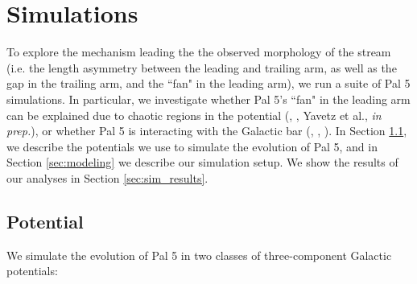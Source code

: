 \documentclass[modern]{aastex62}
\begin{document}
\section{Simulations}
\label{sec:sim}
To explore the mechanism leading the the observed morphology of the stream (i.e. the length asymmetry between the leading and trailing arm, as well as the gap in the trailing arm, and the ``fan" in the leading arm), we run a suite of Pal 5 simulations. In particular, we investigate whether Pal 5's ``fan" in the leading arm can be explained due to chaotic regions in the potential (\citealt{Pearson:2015}, \citealt{Price-Whelan:2016}, Yavetz et al., {\it in prep.}), or whether Pal 5 is interacting with the Galactic bar (\citealt{Erkal:2017}, \citealt{Pearson:2017}, \citealt{Banik:2019}). In Section \ref{sec:potential}, we describe the potentials we use to simulate the evolution of Pal 5, and in Section \ref{sec:modeling} we describe our simulation setup. We show the results of our analyses in Section \ref{sec:sim_results}.

\subsection{Potential}
\label{sec:potential}
We simulate the evolution of Pal 5 in two classes of three-component Galactic potentials: 
\end{document}
